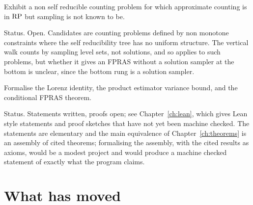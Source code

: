 \begin{problem}
Exhibit a non self reducible counting problem for which approximate counting is in $\mathrm{RP}$ but sampling is not known to be.
\end{problem}

Status. Open. Candidates are counting problems defined by non monotone constraints where the self reducibility tree has no uniform structure. The vertical walk counts by sampling level sets, not solutions, and so applies to such problems, but whether it gives an FPRAS without a solution sampler at the bottom is unclear, since the bottom rung is a solution sampler.

\begin{problem}
Formalise the Lorenz identity, the product estimator variance bound, and the conditional FPRAS theorem.
\end{problem}

Status. Statements written, proofs open; see Chapter~\ref{ch:lean}, which gives Lean style statements and proof sketches that have not yet been machine checked. The statements are elementary and the main equivalence of Chapter~\ref{ch:theorems} is an assembly of cited theorems; formalising the assembly, with the cited results as axioms, would be a modest project and would produce a machine checked statement of exactly what the program claims.



\section{What has moved}

